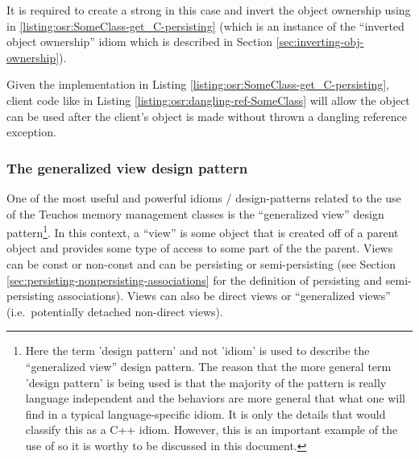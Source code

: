 \documentclass[pdf,ps2pdf,11pt]{SANDreport}
\begin{document}
It is required to create a strong {} in this case and
invert the object ownership using in
{}\ref{listing:osr:SomeClass-get_C-persisting} (which is an instance
of the ``inverted object ownership'' idiom which is described in
Section {}\ref{sec:inverting-obj-ownership}).

Given the implementation in Listing
{}\ref{listing:osr:SomeClass-get_C-persisting}, client code like in
Listing {}\ref{listing:osr:dangling-ref-SomeClass} will allow the
{} object can be used after the client's
{} object is made {} without
thrown a dangling reference exception.


%
{}\subsubsection{The generalized view design pattern}
\label{sec:generalized-view-design-pattern}
%

One of the most useful and powerful idioms / design-patterns related
to the use of the Teuchos memory management classes is the
``generalized view'' design pattern\footnote{Here the term 'design
pattern' and not 'idiom' is used to describe the ``generalized view''
design pattern.  The reason that the more general term 'design
pattern' is being used is that the majority of the pattern is really
language independent and the behaviors are more general that what one
will find in a typical language-specific idiom.  It is only the
{} details that would classify this as a C++ idiom.  However,
this is an important example of the use of {} so it is worthy
to be discussed in this document.}.  In this context, a ``view'' is
some object that is created off of a parent object and provides some
type of access to some part of the the parent.  Views can be const or
non-const and can be persisting or semi-persisting (see Section
{}\ref{sec:persisting-nonpersisting-associations} for the definition
of persisting and semi-persisting associations).  Views can also be
direct views or ``generalized views'' (i.e.\ potentially detached
non-direct views).
\end{document}
